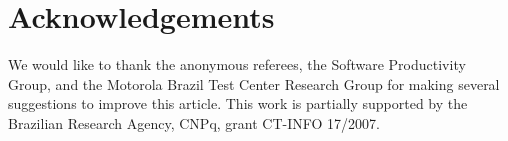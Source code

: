 \documentclass[times, 11pt,twocolumn]{article}
\begin{document}
\section*{Acknowledgements}

We would like to thank the anonymous referees, the Software Productivity Group,
and the Motorola Brazil Test Center Research Group for making several suggestions
to improve this article. This work is partially supported by the Brazilian
Research Agency, CNPq, grant CT-INFO 17/2007.





\end{document}
